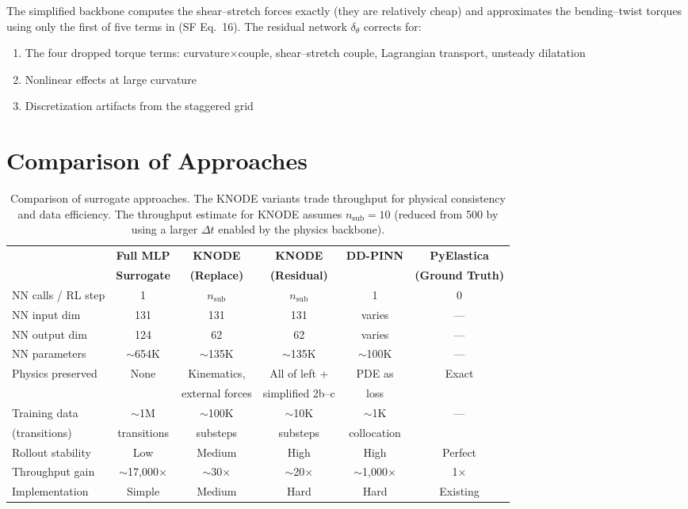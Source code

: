 \documentclass[11pt]{article}
\begin{document}
\noindent
The simplified backbone computes the shear--stretch forces exactly (they are relatively cheap) and approximates the bending--twist torques using only the first of five terms in (SF Eq.~16).
The residual network $\delta_\theta$ corrects for:
\begin{enumerate}[label=(\roman*)]
  \item The four dropped torque terms: curvature$\times$couple, shear--stretch couple, Lagrangian transport, unsteady dilatation
  \item Nonlinear effects at large curvature
  \item Discretization artifacts from the staggered grid
\end{enumerate}


\section{Comparison of Approaches}
\label{sec:comparison}

\begin{table}[H]
  \centering
  \renewcommand{\arraystretch}{1.3}
  \small
  \begin{tabular}{p{3.2cm}ccccc}
    \toprule
    & \textbf{Full MLP} & \textbf{KNODE} & \textbf{KNODE} & \textbf{DD-PINN} & \textbf{PyElastica} \\
    & \textbf{Surrogate} & \textbf{(Replace)} & \textbf{(Residual)} & & \textbf{(Ground Truth)} \\
    \midrule
    NN calls / RL step & 1 & $n_{\text{sub}}$ & $n_{\text{sub}}$ & 1 & 0 \\
    NN input dim & 131 & 131 & 131 & varies & --- \\
    NN output dim & 124 & 62 & 62 & varies & --- \\
    NN parameters & $\sim$654K & $\sim$135K & $\sim$135K & $\sim$100K & --- \\
    Physics preserved & None & Kinematics, & All of left + & PDE as & Exact \\
    & & external forces & simplified 2b--c & loss & \\
    Training data & $\sim$1M & $\sim$100K & $\sim$10K & $\sim$1K & --- \\
    (transitions) & transitions & substeps & substeps & collocation & \\
    Rollout stability & Low & Medium & High & High & Perfect \\
    Throughput gain & $\sim$17{,}000$\times$ & $\sim$30$\times$ & $\sim$20$\times$ & $\sim$1{,}000$\times$ & 1$\times$ \\
    Implementation & Simple & Medium & Hard & Hard & Existing \\
    \bottomrule
  \end{tabular}
  \caption{Comparison of surrogate approaches.  The KNODE variants trade throughput for physical consistency and data efficiency.  The throughput estimate for KNODE assumes $n_{\text{sub}} = 10$ (reduced from 500 by using a larger $\Delta t$ enabled by the physics backbone).}
  \label{tab:comparison}
\end{table}
\end{document}

